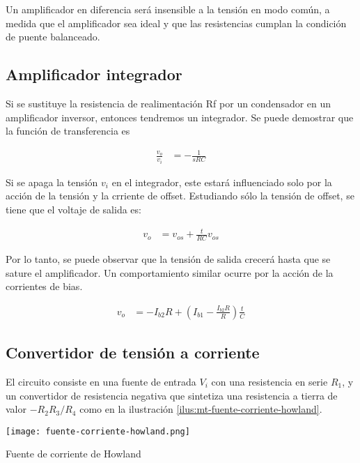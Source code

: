 Un amplificador en diferencia será insensible a la tensión en modo común,
a medida que el amplificador sea ideal y que las resistencias cumplan la
condición de puente balanceado.

\subsection{Amplificador integrador}

Si se sustituye la resistencia de realimentación Rf por un condensador en un amplificador inversor, entonces tendremos un integrador. Se puede demostrar que la función de transferencia es

\begin{align*}
\frac{v_o}{v_i} &= -\frac{1}{sRC}
\end{align*}

Si se apaga la tensión $v_i$ en el integrador, este estará influenciado solo por la acción de la tensión y la crriente de offset. Estudiando sólo la tensión de offset, se tiene que el voltaje de salida es:

\begin{align*}
v_o &= v_{os} + \frac{t}{RC} v_{os}
\end{align*}

Por lo tanto, se puede observar que la tensión de salida crecerá hasta que se sature el amplificador. Un comportamiento similar ocurre por la acción de la corrientes de bias.

\begin{align*}
v_o &= -I_{b2}R + \left( I_{b1} - \frac{I_{b2}R}{R} \right) \frac{t}{C}
\end{align*}

\subsection{Convertidor de tensión a corriente}

El circuito consiste en una fuente de entrada $V_i$ con una resistencia en serie $R_1$, y un convertidor de resistencia negativa que sintetiza una resistencia a tierra de valor $-R_2 R_3 / R_4$ como en la ilustración \ref{ilus:mt-fuente-corriente-howland}.

\begin{ilustracion}
    \centering
    \texttt{[image: fuente-corriente-howland.png]}
    \caption{Fuente de corriente de Howland}
    \label{ilus:mt-fuente-corriente-howland}
\end{ilustracion}

